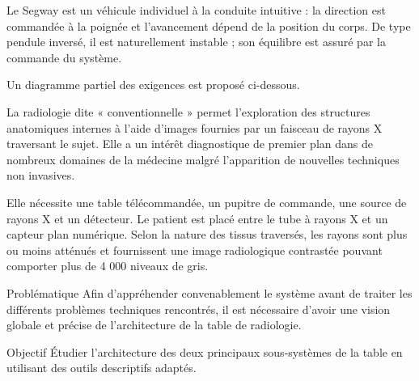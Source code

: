 Le Segway est un véhicule individuel à la conduite intuitive : la direction est
commandée à la poignée et l'avancement dépend de la position du corps. De type
pendule inversé, il est naturellement instable ; son équilibre est assuré par
la commande du système.


Un diagramme partiel des exigences est proposé ci-dessous.



La radiologie dite « conventionnelle » permet l'exploration des structures
anatomiques internes à l'aide d'images fournies par un faisceau de rayons X
traversant le sujet. Elle a un intérêt diagnostique de premier plan dans de
nombreux domaines de la médecine malgré l'apparition de nouvelles techniques
non invasives.

Elle nécessite une table télécommandée, un pupitre de commande, une source de
rayons X et un détecteur. Le patient est placé entre le tube à rayons X et un
capteur plan numérique. Selon la nature des tissus traversés, les rayons sont
plus ou moins atténués et fournissent une image radiologique contrastée pouvant
comporter plus de 4 000 niveaux de gris.


\begin{AFexerciseinfo}{Problématique}
Afin d'appréhender convenablement le système avant de traiter les différents
problèmes techniques rencontrés, il est nécessaire d'avoir une vision globale
et précise de l'architecture de la table de radiologie.
\end{AFexerciseinfo}

\begin{AFexerciseinfo}{Objectif}
Étudier l'architecture des deux principaux sous-systèmes de la table en
utilisant des outils descriptifs adaptés.
\end{AFexerciseinfo}


